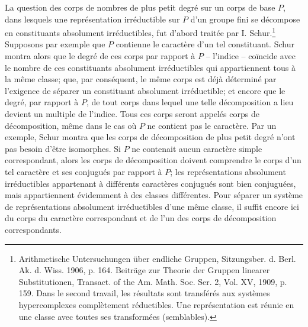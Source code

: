 La question des corps de nombres de plus petit degré sur un corps de base $P$, dans lesquels une représentation irréductible sur $P$ d'un groupe fini se décompose en constituants absolument irréductibles, fut d'abord traitée par I. Schur.\footnote{Arithmetische Untersuchungen über endliche Gruppen, Sitzungsber. d. Berl. Ak. d. Wiss. 1906, p. 164. Beiträge zur Theorie der Gruppen linearer Substitutionen, Transact. of the Am. Math. Soc. Ser. 2, Vol. XV, 1909, p. 159. Dans le second travail, les résultats sont transférés aux systèmes hypercomplexes complètement réductibles. Une représentation est réunie en une classe avec toutes ses transformées (semblables).} Supposons par exemple que $P$ contienne le caractère d'un tel constituant. Schur montra alors que le degré de ces corps par rapport à $P$ -- l'indice -- coïncide avec le nombre de ces constituants absolument irréductibles qui appartiennent tous à la même classe; que, par conséquent, le même corps est déjà déterminé par l'exigence de séparer un constituant absolument irréductible; et encore que le degré, par rapport à $P$, de tout corps dans lequel une telle décomposition a lieu devient un multiple de l'indice. Tous ces corps seront appelés corps de décomposition, même dans le cas où $P$ ne contient pas le caractère. Par un exemple, Schur montra que les corps de décomposition de plus petit degré n'ont pas besoin d'être isomorphes. Si $P$ ne contenait aucun caractère simple correspondant, alors les corps de décomposition doivent comprendre le corps d'un tel caractère et ses conjugués par rapport à $P$; les représentations absolument irréductibles appartenant à différents caractères conjugués sont bien conjuguées, mais appartiennent évidemment à des classes différentes. Pour séparer un système de représentations absolument irréductibles d'une même classe, il suffit encore ici du corps du caractère correspondant et de l'un des corps de décomposition correspondants.

